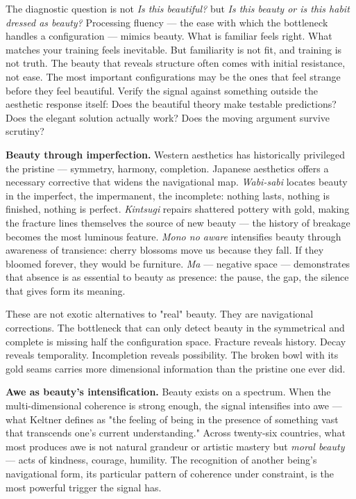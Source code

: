 The diagnostic question is not \textit{Is this beautiful?} but \textit{Is this beauty or is this habit dressed as beauty?} Processing fluency — the ease with which the bottleneck handles a configuration — mimics beauty. What is familiar feels right. What matches your training feels inevitable. But familiarity is not fit, and training is not truth. The beauty that reveals structure often comes with initial resistance, not ease. The most important configurations may be the ones that feel strange before they feel beautiful. Verify the signal against something outside the aesthetic response itself: Does the beautiful theory make testable predictions? Does the elegant solution actually work? Does the moving argument survive scrutiny?


\textbf{Beauty through imperfection.} Western aesthetics has historically privileged the pristine — symmetry, harmony, completion. Japanese aesthetics offers a necessary corrective that widens the navigational map. \textit{Wabi-sabi} locates beauty in the imperfect, the impermanent, the incomplete: nothing lasts, nothing is finished, nothing is perfect. \textit{Kintsugi} repairs shattered pottery with gold, making the fracture lines themselves the source of new beauty — the history of breakage becomes the most luminous feature. \textit{Mono no aware} intensifies beauty through awareness of transience: cherry blossoms move us because they fall. If they bloomed forever, they would be furniture. \textit{Ma} — negative space — demonstrates that absence is as essential to beauty as presence: the pause, the gap, the silence that gives form its meaning.


These are not exotic alternatives to "real" beauty. They are navigational corrections. The bottleneck that can only detect beauty in the symmetrical and complete is missing half the configuration space. Fracture reveals history. Decay reveals temporality. Incompletion reveals possibility. The broken bowl with its gold seams carries more dimensional information than the pristine one ever did.


\textbf{Awe as beauty's intensification.} Beauty exists on a spectrum. When the multi-dimensional coherence is strong enough, the signal intensifies into awe — what Keltner defines as "the feeling of being in the presence of something vast that transcends one's current understanding." Across twenty-six countries, what most produces awe is not natural grandeur or artistic mastery but \textit{moral beauty} — acts of kindness, courage, humility. The recognition of another being's navigational form, its particular pattern of coherence under constraint, is the most powerful trigger the signal has.


